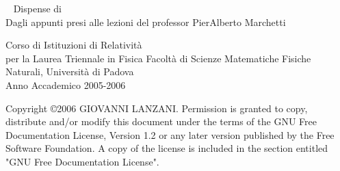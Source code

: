 \begin{titlepage}
\begin{center}
\mbox{} \vskip 2cm
\ \Huge \hskip 0.5cm Dispense di \\
\vskip 2cm
\normalsize Dagli appunti presi alle lezioni del professor PierAlberto Marchetti\\
\vskip 3cm

 Corso di Istituzioni di Relativit\`a \\
\hskip 1.78cm per la Laurea Triennale in Fisica \newline
Facolt\`a di Scienze Matematiche Fisiche Naturali, Universit\`a di Padova \\
Anno Accademico 2005-2006\\
\vspace{1cm}


\end{center}
\end{titlepage}


Copyright \copyright  2006 GIOVANNI LANZANI. \newline
      Permission is granted to copy, distribute and/or modify this
      document \newline
      under the terms of the GNU Free Documentation License, Version 1.2 \newline
      or any later version published by the Free Software Foundation. \newline
      A copy of the license is included in the section entitled "GNU \newline
      Free Documentation License". \newline
